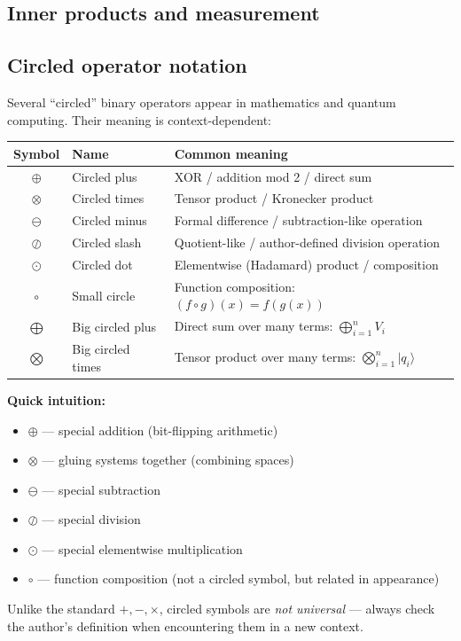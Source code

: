 \subsection{Inner products and measurement}


\subsection{Circled operator notation}

\begin{remark}
Several ``circled'' binary operators appear in mathematics and quantum computing. Their meaning is context-dependent:

\begin{center}
\begin{tabular}{c|l|l}
Symbol & Name & Common meaning \\
\hline
$\oplus$ & Circled plus & XOR / addition mod 2 / direct sum \\
$\otimes$ & Circled times & Tensor product / Kronecker product \\
$\ominus$ & Circled minus & Formal difference / subtraction-like operation \\
$\oslash$ & Circled slash & Quotient-like / author-defined division operation \\
$\odot$ & Circled dot & Elementwise (Hadamard) product / composition \\
$\circ$ & Small circle & Function composition: $(f \circ g)(x) = f(g(x))$ \\
$\bigoplus$ & Big circled plus & Direct sum over many terms: $\bigoplus_{i=1}^n V_i$ \\
$\bigotimes$ & Big circled times & Tensor product over many terms: $\bigotimes_{i=1}^n |q_i\rangle$ \\
\end{tabular}
\end{center}

\textbf{Quick intuition:}
\begin{itemize}
    \item $\oplus$ — special addition (bit-flipping arithmetic)
    \item $\otimes$ — gluing systems together (combining spaces)
    \item $\ominus$ — special subtraction
    \item $\oslash$ — special division
    \item $\odot$ — special elementwise multiplication
    \item $\circ$ — function composition (not a circled symbol, but related in appearance)
\end{itemize}
Unlike the standard $+, -, \times$, circled symbols are \emph{not universal} — always check the author's definition when encountering them in a new context.
\end{remark}
